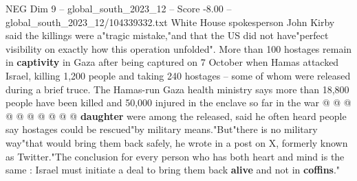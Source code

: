 \begin{textsample}{NEG Dim 9 – global\_south\_2023\_12 – Score -8.00 – global\_south\_2023\_12/104339332.txt}
White House spokesperson John Kirby said the killings were a"tragic mistake,"and that the US did not have"perfect visibility on exactly how this operation unfolded".
More than 100 hostages remain in \textbf{captivity} in Gaza after being captured on 7 October when Hamas attacked Israel, killing 1,200 people and taking 240 hostages -- some of whom were released during a brief truce.
The Hamas-run Gaza health ministry says more than 18,800 people have been killed and 50,000 injured in the enclave so far in the war @ @ @ @ @ @ @ @ @ @ \textbf{daughter} were among the released, said he often heard people say hostages could be rescued"by military means."But"there is no military way"that would bring them back safely, he wrote in a post on X, formerly known as Twitter."The conclusion for every person who has both heart and mind is the same : Israel must initiate a deal to bring them back \textbf{alive} and not in \textbf{coffins}."

\end{textsample}
